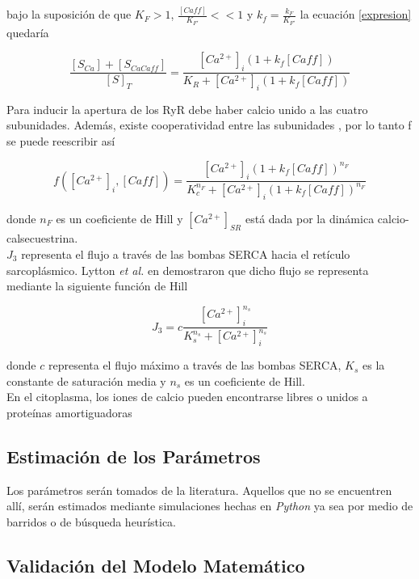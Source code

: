 \documentclass[draft]{article}
\newcommand{\Cai}{[Ca^{2+}]_{i}}
\newcommand{\Cal}{[Ca^{2+}]_{SR}}
\newcommand{\al}{\textit{et al.} }
\begin{document}
bajo la suposición de que $K_F > 1$, $\frac{[Caff]}{K_{F'}} << 1$ y $k_f = \frac{k_F}{K_{F'}}$ la ecuación \ref{expresion} quedaría

\begin{equation}
\frac{[S_{Ca}] + [S_{CaCaff}]}{[S]_T} = \frac{\Cai\left(1 + k_f[Caff]\right)}{K_R + \Cai\left(1 + k_f[Caff]\right)}
\end{equation}

Para inducir la apertura de los RyR debe haber calcio unido a las cuatro subunidades. Además, existe cooperatividad entre las subunidades \cite{Santillan2008}, por lo tanto f se puede reescribir así

\begin{equation}
f\left([Ca^{2+}]_i, [Caff]\right)=\frac{[Ca^{2+}]_i\left(1 + k_f[Caff]\right)^{n_F}}{K^{n_F}_c + [Ca^{2+}]_i\left(1+k_f[Caff]\right)^{n_F}}
\end{equation}

donde $n_F$ es un coeficiente de Hill y $\Cal$ está dada por la dinámica calcio-calsecuestrina. \\

$J_3$ representa el flujo a través de las bombas SERCA hacia el retículo sarcoplásmico. Lytton \al en \cite{Lytton1992} demostraron que dicho flujo se representa mediante la siguiente función de Hill

\begin{equation}
J_3= c\frac{[Ca^{2+}]^{n_s}_i}{K^{n_s}_s+[Ca^{2+}]^{n_s}_i}
\end{equation}

donde $c$ representa el flujo máximo a través de las bombas SERCA, $K_s$ es la constante de saturación media y $n_s$ es un coeficiente de Hill. \\

En el citoplasma, los iones de calcio pueden encontrarse libres o unidos a proteínas amortiguadoras

\subsection{Estimación de los Parámetros}

Los parámetros serán tomados de la literatura. Aquellos que no se encuentren allí, serán estimados mediante simulaciones hechas en \textit{Python} ya sea por medio de barridos o de búsqueda heurística.

\subsection{Validación del Modelo Matemático}
\end{document}
